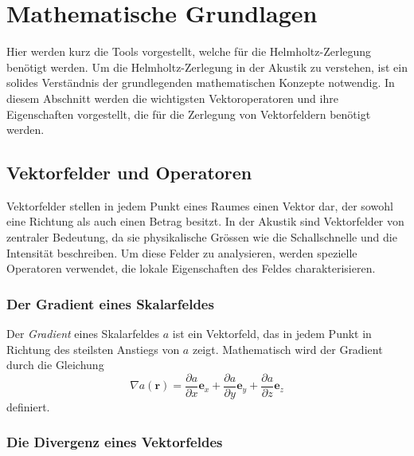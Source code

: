 %
%
%
%
\section{Mathematische Grundlagen
\label{helmholtz:section:Mahtematische_Grundlagen}}

Hier werden kurz die Tools vorgestellt, welche für die Helmholtz-Zerlegung
benötigt werden.
Um die Helmholtz-Zerlegung in der Akustik zu verstehen, ist ein
solides Verständnis der grundlegenden mathematischen Konzepte
notwendig.
In diesem Abschnitt werden die wichtigsten Vektoroperatoren und
ihre Eigenschaften vorgestellt, die für die Zerlegung von Vektorfeldern
benötigt werden.

\subsection{Vektorfelder und Operatoren
\label{helmholtz:subsection:Vektorfelder_Operatoren}}

Vektorfelder stellen in jedem Punkt eines Raumes einen Vektor dar,
der sowohl eine Richtung als auch einen Betrag besitzt.
In der Akustik sind Vektorfelder von zentraler Bedeutung, da sie
physikalische Grössen wie die Schallschnelle und die Intensität
beschreiben.
Um diese Felder zu analysieren, werden spezielle Operatoren verwendet,
die lokale Eigenschaften des Feldes charakterisieren.

\subsubsection{Der Gradient eines Skalarfeldes}

Der \emph{Gradient} eines Skalarfeldes $a$ ist ein Vektorfeld, das in jedem
%
Punkt in Richtung des steilsten Anstiegs von $a$ zeigt.
Mathematisch wird der Gradient durch die Gleichung
\begin{equation*}
\nabla a (\boldsymbol{r})
=
\frac{\partial a}{\partial x}\boldsymbol{e}_x
+
\frac{\partial a}{\partial y}\boldsymbol{e}_y
+
\frac{\partial a}{\partial z}\boldsymbol{e}_z
\end{equation*}
definiert.



\subsubsection{Die Divergenz eines Vektorfeldes}

